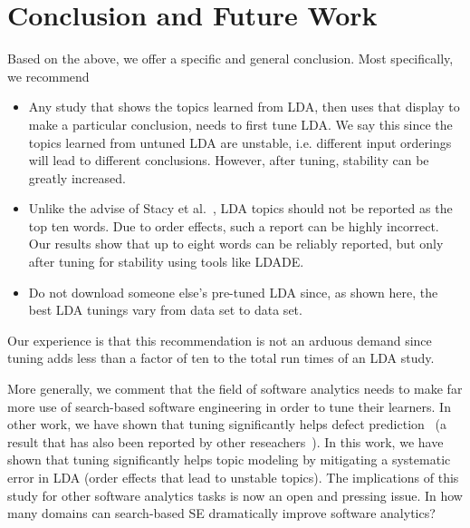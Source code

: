 \documentclass[10pt,conference]{IEEEtran}
\newcommand{\bi}{\begin{itemize}}
\newcommand{\ei}{\end{itemize}}
\theoremstyle{break}
\begin{document}
\section{Conclusion and Future Work}

Based on the above, we offer a specific and general conclusion. Most specifically, we recommend 
\bi
\item  
Any study that shows the topics learned from LDA, then uses that display to make a particular
conclusion, needs to first tune LDA. We say this since the topics learned from untuned LDA are unstable, i.e. different input orderings will lead to different conclusions.
However, after tuning, stability can be greatly increased.
\item Unlike the advise of Stacy et al.~\cite{lukins2010bug}, LDA topics should not be reported as the top ten words.
  Due to order effects, such a report can be highly incorrect.
  Our results show that up to eight words can be reliably reported, but only
  after tuning for stability using tools like LDADE.
\item Do not download someone else's pre-tuned LDA since, as shown here,  the best LDA tunings vary from data set to data set.
\ei
Our experience is that this recommendation is not an arduous demand since tuning adds less than a factor of ten to the total run times of an LDA study.


More generally, we comment that the field of software analytics needs to make far more use of search-based software engineering in order
to tune their learners. In other work, we have shown that tuning significantly helps defect prediction~\cite{fu2016tuning} (a result that has also been reported by
other reseachers~\cite{panichella2013effectively}). In this work, we have shown that tuning significantly helps topic modeling by mitigating a systematic error in LDA  (order effects that lead to unstable topics). The implications of this study for other software analytics tasks is now an open
and pressing issue. 
In how many domains can search-based SE dramatically improve software analytics?





\medskip



\end{document}
